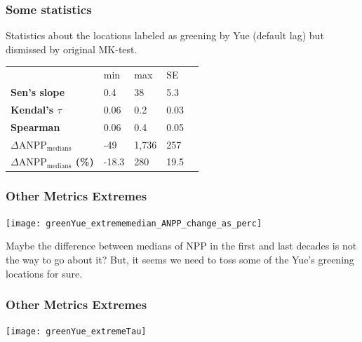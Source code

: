 \documentclass[serif, xcolor={dvipsnames}]{beamer} %
\begin{document}
\begin{frame}
\frametitle{Some statistics}
Statistics about the locations labeled as greening by Yue (default lag) but dismissed by original MK-test.
\begin{table}[!ht]
\centering
\captionsetup{singlelinecheck=false, format=hang}
\label{tab:Trendcounts}
\begin{tabular}{lllll}
\bottomrule
\rowcolor{shadecolor} 
&  min & max & SE \\ 
\rowcolor{aliceblue} 
\textbf{Sen's slope} & 0.4 & 38 & 5.3 \\
\textbf{Kendal's $\tau$}  & 0.06 & 0.2 &  0.03 \\
\rowcolor{aliceblue} 
\textbf{Spearman}  & 0.06  & 0.4 & 0.05  \\
\textbf{\scriptsize $\Delta \text{ANPP}_{\text{medians}}$} & -49 & 1,736 & 257 \\
\rowcolor{aliceblue}\textbf{\scriptsize $\Delta \text{ANPP}_{\text{medians}}$ (\%)}  & -18.3 & 280 & 19.5 \\
\toprule
\end{tabular}
\end{table}
\end{frame}


\begin{frame}
\frametitle{Other Metrics Extremes}
\begin{center}
\texttt{[image: greenYue\_extrememedian\_ANPP\_change\_as\_perc]}
\end{center}
\vspace{-.2in}
{\scriptsize Maybe the difference between medians of NPP in the first and last decades is not the way to go about it?
But, it seems we need to toss some of the Yue's greening locations for sure.}
\end{frame}
\begin{frame}
\frametitle{Other Metrics Extremes}
\begin{center}
\texttt{[image: greenYue\_extremeTau]}
\end{center}
\end{frame}
\end{document}
